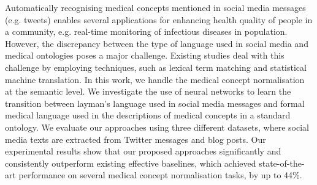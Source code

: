 Automatically recognising medical concepts mentioned in social media messages (e.g. tweets) enables several applications for enhancing health quality of people in a community, e.g. real-time monitoring of infectious diseases in population. However, the discrepancy between the type of language used in social media and medical ontologies poses a major challenge. Existing studies deal with this challenge by employing techniques, such as lexical term matching and statistical machine translation. In this work, we handle the medical concept normalisation at the semantic level. We investigate the use of neural networks to learn the transition between layman's language used in social media messages and formal medical language used in the descriptions of medical concepts in a standard ontology. We evaluate our approaches using three different datasets, where social media texts are extracted from Twitter messages and blog posts. Our experimental results show that our proposed approaches significantly and consistently outperform existing effective baselines, which achieved state-of-the-art performance on several medical concept normalisation tasks, by up to 44\%.
